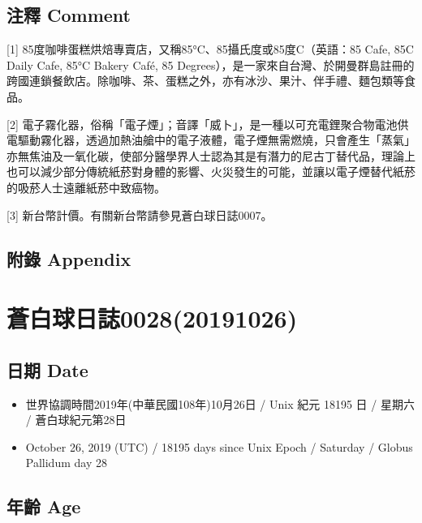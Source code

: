 \documentclass[a5paper, 12pt
]{book}
\providecommand{\tightlist}{%
  \setlength{\itemsep}{0pt}\setlength{\parskip}{0pt}}
\begin{document}
\hypertarget{ux6ce8ux91cb-comment-20}{%
\subsection{注釋 Comment}\label{ux6ce8ux91cb-comment-20}}

{[}1{]} 85度咖啡蛋糕烘焙專賣店，又稱85°C、85攝氏度或85度C（英語：85
Cafe, 85C Daily Cafe, 85°C Bakery Café, 85
Degrees），是一家來自台灣、於開曼群島註冊的跨國連鎖餐飲店。除咖啡、茶、蛋糕之外，亦有冰沙、果汁、伴手禮、麵包類等食品。

{[}2{]}
電子霧化器，俗稱「電子煙」；音譯「威卜」，是一種以可充電鋰聚合物電池供電驅動霧化器，透過加熱油艙中的電子液體，電子煙無需燃燒，只會產生「蒸氣」亦無焦油及一氧化碳，使部分醫學界人士認為其是有潛力的尼古丁替代品，理論上也可以減少部分傳統紙菸對身體的影響、火災發生的可能，並讓以電子煙替代紙菸的吸菸人士遠離紙菸中致癌物。

{[}3{]} 新台幣計價。有關新台幣請參見蒼白球日誌0007。

\hypertarget{ux9644ux9304-appendix-19}{%
\subsection{附錄 Appendix}\label{ux9644ux9304-appendix-19}}

\hypertarget{ux84bcux767dux7403ux65e5ux8a8c002820191026}{%
\section{蒼白球日誌0028(20191026)}\label{ux84bcux767dux7403ux65e5ux8a8c002820191026}}

\hypertarget{ux65e5ux671f-date-27}{%
\subsection{日期 Date}\label{ux65e5ux671f-date-27}}

\begin{itemize}
\tightlist
\item
  世界協調時間2019年(中華民國108年)10月26日 / Unix 紀元 18195 日 /
  星期六 / 蒼白球紀元第28日
\item
  October 26, 2019 (UTC) / 18195 days since Unix Epoch / Saturday /
  Globus Pallidum day 28
\end{itemize}

\hypertarget{ux5e74ux9f61-age-27}{%
\subsection{年齡 Age}\label{ux5e74ux9f61-age-27}}
\end{document}
